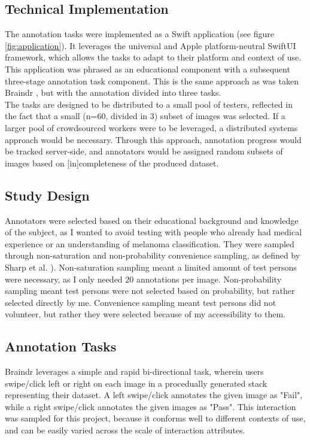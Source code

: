 \documentclass[../report.tex]{subfiles}
\begin{document}
\subsection{Technical Implementation}

The annotation tasks were implemented as a Swift application (see figure \ref{fig:application}). It leverages the universal and Apple platform-neutral SwiftUI framework, which allows the tasks to adapt to their platform and context of use. This application was phrased as an educational component with a subsequent three-stage annotation task component. This is the same approach as was taken Braindr \cite{Braindr}, but with the annotation divided into three tasks. \\

The tasks are designed to be distributed to a small pool of testers, reflected in the fact that a small (n=60, divided in 3) subset of images was selected. If a larger pool of crowdsourced workers were to be leveraged, a distributed systems approach would be necessary. Through this approach, annotation progress would be tracked server-side, and annotators would be assigned random subsets of images based on [in]completeness of the produced dataset.

\subsection{Study Design}

Annotators were selected based on their educational background and knowledge of the subject, as I wanted to avoid testing with people who already had medical experience or an understanding of melanoma classification. They were sampled through non-saturation and non-probability convenience sampling, as defined by Sharp et al. \cite{sharp2019interaction}). Non-saturation sampling meant a limited amount of test persons were necessary, as I only needed 20 annotations per image. Non-probability sampling meant test persons were not selected based on probability, but rather selected directly by me. Convenience sampling meant test persons did not volunteer, but rather they were selected because of my accessibility to them.

\subsection{Annotation Tasks}

Braindr \cite{Braindr} leverages a simple and rapid bi-directional task, wherein users swipe/click left or right on each image in a procedually generated stack representing their dataset. A left swipe/click annotates the given image as "Fail", while a right swipe/click annotates the given images as "Pass". This interaction was sampled for this project, because it conforms well to different contexts of use, and can be easily varied across the scale of interaction attributes. \\
\end{document}
